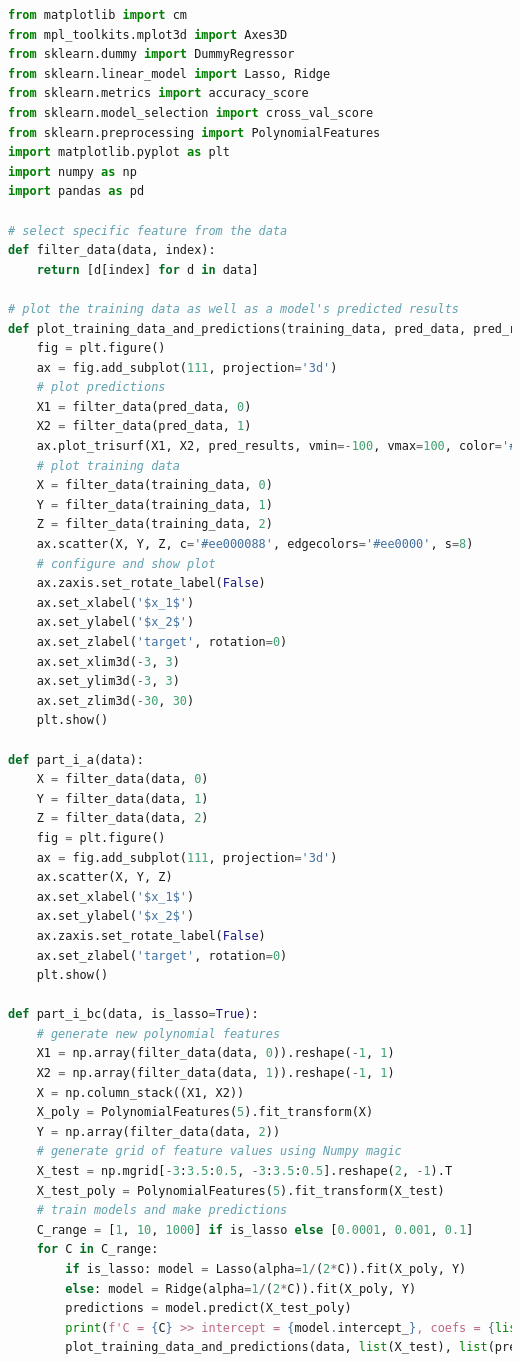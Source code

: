 \documentclass[12pt]{article}
\begin{document}
\lstset{basicstyle=\footnotesize}
\begin{lstlisting}[language=Python]
from matplotlib import cm
from mpl_toolkits.mplot3d import Axes3D
from sklearn.dummy import DummyRegressor
from sklearn.linear_model import Lasso, Ridge
from sklearn.metrics import accuracy_score
from sklearn.model_selection import cross_val_score
from sklearn.preprocessing import PolynomialFeatures
import matplotlib.pyplot as plt
import numpy as np
import pandas as pd

# select specific feature from the data
def filter_data(data, index):
    return [d[index] for d in data]

# plot the training data as well as a model's predicted results
def plot_training_data_and_predictions(training_data, pred_data, pred_results):
    fig = plt.figure()
    ax = fig.add_subplot(111, projection='3d')
    # plot predictions
    X1 = filter_data(pred_data, 0)
    X2 = filter_data(pred_data, 1)
    ax.plot_trisurf(X1, X2, pred_results, vmin=-100, vmax=100, color='#0000ff80')
    # plot training data
    X = filter_data(training_data, 0)
    Y = filter_data(training_data, 1)
    Z = filter_data(training_data, 2)
    ax.scatter(X, Y, Z, c='#ee000088', edgecolors='#ee0000', s=8)
    # configure and show plot
    ax.zaxis.set_rotate_label(False)
    ax.set_xlabel('$x_1$')
    ax.set_ylabel('$x_2$')
    ax.set_zlabel('target', rotation=0)
    ax.set_xlim3d(-3, 3)
    ax.set_ylim3d(-3, 3)
    ax.set_zlim3d(-30, 30)
    plt.show()

def part_i_a(data):
    X = filter_data(data, 0)
    Y = filter_data(data, 1)
    Z = filter_data(data, 2)
    fig = plt.figure()
    ax = fig.add_subplot(111, projection='3d')
    ax.scatter(X, Y, Z)
    ax.set_xlabel('$x_1$')
    ax.set_ylabel('$x_2$')
    ax.zaxis.set_rotate_label(False)
    ax.set_zlabel('target', rotation=0)
    plt.show()

def part_i_bc(data, is_lasso=True):
    # generate new polynomial features
    X1 = np.array(filter_data(data, 0)).reshape(-1, 1)
    X2 = np.array(filter_data(data, 1)).reshape(-1, 1)
    X = np.column_stack((X1, X2))
    X_poly = PolynomialFeatures(5).fit_transform(X)
    Y = np.array(filter_data(data, 2))
    # generate grid of feature values using Numpy magic
    X_test = np.mgrid[-3:3.5:0.5, -3:3.5:0.5].reshape(2, -1).T
    X_test_poly = PolynomialFeatures(5).fit_transform(X_test)
    # train models and make predictions
    C_range = [1, 10, 1000] if is_lasso else [0.0001, 0.001, 0.1]
    for C in C_range:
        if is_lasso: model = Lasso(alpha=1/(2*C)).fit(X_poly, Y)
        else: model = Ridge(alpha=1/(2*C)).fit(X_poly, Y)
        predictions = model.predict(X_test_poly)
        print(f'C = {C} >> intercept = {model.intercept_}, coefs = {list(model.coef_)}')
        plot_training_data_and_predictions(data, list(X_test), list(predictions))


\end{lstlisting}
\end{document}
